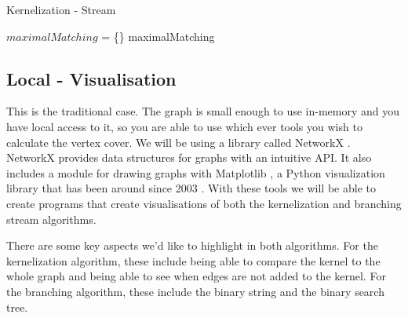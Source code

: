 \begin{algorithm}[htb]
    \caption{Kernelization - Stream}
    \label{alg:kernelization_stream}
    \DontPrintSemicolon


    $maximalMatching$ = \{\}\;
    \Return maximalMatching\;
\end{algorithm}

\subsection{Local - Visualisation}

This is the traditional case. The graph is small enough to use in-memory and
you have local access to it, so you are able to use which ever tools you wish
to calculate the vertex cover. We will be using a library called NetworkX
\cite{hagberg2008exploring}. NetworkX provides data structures for graphs with
an intuitive API. It also includes a module for drawing graphs with Matplotlib
\cite{hunter2007matplotlib}, a Python visualization library that has been
around since 2003 \cite{matplotlib2003copyright}. With these tools we will be
able to create programs that create visualisations of both the kernelization
and branching stream algorithms.

There are some key aspects we'd like to highlight in both algorithms. For the
kernelization algorithm, these include being able to compare the kernel to the
whole graph and being able to see when edges are not added to the kernel. For
the branching algorithm, these include the binary string and the binary search
tree.

